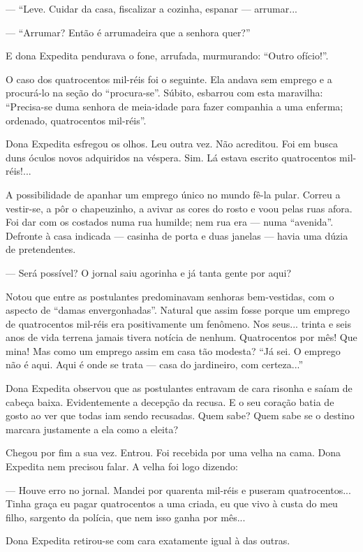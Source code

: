 --- ``Leve. Cuidar da casa, fiscalizar a cozinha, espanar --- arrumar...

--- ``Arrumar? Então é arrumadeira que a senhora quer?''

E dona Expedita pendurava o fone, arrufada, murmurando: ``Outro
ofício!''.

O caso dos quatrocentos mil-réis foi o seguinte. Ela andava sem emprego
e a procurá-lo na seção do ``procura-se''. Súbito, esbarrou com esta
maravilha: ``Precisa-se duma senhora de meia-idade para fazer companhia
a uma enferma; ordenado, quatrocentos mil-réis''.

Dona Expedita esfregou os olhos. Leu outra vez. Não acreditou. Foi em
busca duns óculos novos adquiridos na véspera. Sim. Lá estava escrito
quatrocentos mil-réis!...

A possibilidade de apanhar um emprego único no mundo fê-la pular. Correu
a vestir-se, a pôr o chapeuzinho, a avivar as cores do rosto e voou
pelas ruas afora. Foi dar com os costados numa rua humilde; nem rua era
--- numa ``avenida''. Defronte à casa indicada --- casinha de porta e
duas janelas --- havia uma dúzia de pretendentes.

--- Será possível? O jornal saiu agorinha e já tanta gente por aqui?

Notou que entre as postulantes predominavam senhoras bem-vestidas, com o
aspecto de ``damas envergonhadas''. Natural que assim fosse porque um
emprego de quatrocentos mil-réis era positivamente um fenômeno. Nos
seus... trinta e seis anos de vida terrena jamais tivera notícia de
nenhum. Quatrocentos por mês! Que mina! Mas como um emprego assim em
casa tão modesta? ``Já sei. O emprego não é aqui. Aqui é onde se trata
--- casa do jardineiro, com certeza...''

Dona Expedita observou que as postulantes entravam de cara risonha e
saíam de cabeça baixa. Evidentemente a decepção da recusa. E o seu
coração batia de gosto ao ver que todas iam sendo recusadas. Quem sabe?
Quem sabe se o destino marcara justamente a ela como a eleita?

Chegou por fim a sua vez. Entrou. Foi recebida por uma velha na cama.
Dona Expedita nem precisou falar. A velha foi logo dizendo:

--- Houve erro no jornal. Mandei por quarenta mil-réis e puseram
quatrocentos... Tinha graça eu pagar quatrocentos a uma criada, eu que
vivo à custa do meu filho, sargento da polícia, que nem isso ganha por
mês...

Dona Expedita retirou-se com cara exatamente igual à das outras.

